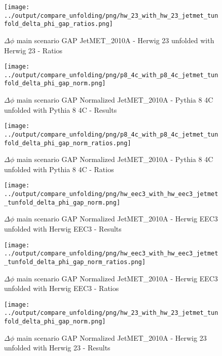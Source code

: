 \documentclass[11pt]{book}
\begin{document}
\begin{figure}[ht]
\centering
\texttt{[image: ../output/compare\_unfolding/png/hw\_23\_with\_hw\_23\_jetmet\_tunfold\_delta\_phi\_gap\_ratios.png]}
\caption{$\Delta\phi$ main scenario GAP JetMET\_2010A - Herwig 23 unfolded with Herwig 23 - Ratios}
\label{hw_23_hw_23_jetmet_tunfold_delta_phi_gap_b}
\end{figure}


\begin{figure}[ht]
\centering
\texttt{[image: ../output/compare\_unfolding/png/p8\_4c\_with\_p8\_4c\_jetmet\_tunfold\_delta\_phi\_gap\_norm.png]}
\caption{$\Delta\phi$ main scenario GAP Normalized JetMET\_2010A - Pythia 8 4C unfolded with Pythia 8 4C - Results}
\label{p8_p8_jetmet_tunfold_delta_phi_gap_norm_a}
\end{figure}

\begin{figure}[ht]
\centering
\texttt{[image: ../output/compare\_unfolding/png/p8\_4c\_with\_p8\_4c\_jetmet\_tunfold\_delta\_phi\_gap\_norm\_ratios.png]}
\caption{$\Delta\phi$ main scenario GAP Normalized JetMET\_2010A - Pythia 8 4C unfolded with Pythia 8 4C - Ratios}
\label{p8_p8_jetmet_tunfold_delta_phi_gap_norm_b}
\end{figure}

\begin{figure}[ht]
\centering
\texttt{[image: ../output/compare\_unfolding/png/hw\_eec3\_with\_hw\_eec3\_jetmet\_tunfold\_delta\_phi\_gap\_norm.png]}
\caption{$\Delta\phi$ main scenario GAP Normalized JetMET\_2010A - Herwig EEC3 unfolded with Herwig EEC3 - Results}
\label{hw_eec3_hw_eec3_jetmet_tunfold_delta_phi_gap_norm_a}
\end{figure}

\begin{figure}[ht]
\centering
\texttt{[image: ../output/compare\_unfolding/png/hw\_eec3\_with\_hw\_eec3\_jetmet\_tunfold\_delta\_phi\_gap\_norm\_ratios.png]}
\caption{$\Delta\phi$ main scenario GAP Normalized JetMET\_2010A - Herwig EEC3 unfolded with Herwig EEC3 - Ratios}
\label{hw_eec3_hw_eec3_jetmet_tunfold_delta_phi_gap_norm_b}
\end{figure}

\begin{figure}[ht]
\centering
\texttt{[image: ../output/compare\_unfolding/png/hw\_23\_with\_hw\_23\_jetmet\_tunfold\_delta\_phi\_gap\_norm.png]}
\caption{$\Delta\phi$ main scenario GAP Normalized JetMET\_2010A - Herwig 23 unfolded with Herwig 23 - Results}
\label{hw_23_hw_23_jetmet_tunfold_delta_phi_gap_norm_a}
\end{figure}
\end{document}
